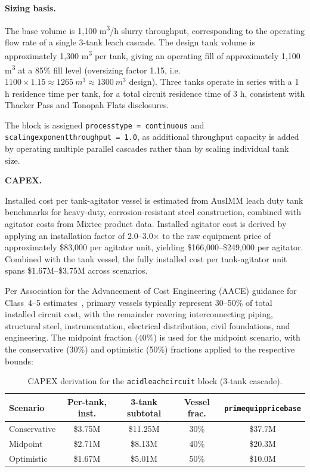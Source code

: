 \documentclass{article}
\renewcommand\_{\textunderscore\allowbreak}
\begin{document}
\medskip
\noindent\textbf{Sizing basis.}\quad

The base volume is 1,100 \si{m^3/h} slurry throughput, corresponding to the operating flow rate of a single 3-tank leach cascade. The design tank volume is approximately 1,300 \si{m^3} per tank, giving an operating fill of approximately 1,100 \si{m^3} at a 85\% fill level (oversizing factor 1.15, i.e.\ $1100 \times 1.15 \approx 1265~ \si{m^3} \approx 1300~\si{m^3}$ design). Three tanks operate in series with a 1 h residence time per tank, for a total circuit residence time of 3 h, consistent with Thacker Pass and Tonopah Flats disclosures.

The block is assigned \texttt{process\_type = continuous} and \texttt{scaling\_exponent\_throughput = 1.0}, as additional throughput capacity is added by operating multiple parallel cascades rather than by scaling individual tank size.

\medskip
\noindent\textbf{CAPEX.}\quad

Installed cost per tank-agitator vessel is estimated from AusIMM leach duty tank benchmarks for heavy-duty, corrosion-resistant steel construction, combined with agitator costs from Mixtec product data. Installed agitator cost is derived by applying an installation factor of 2.0--3.0$\times$ to the raw equipment price of approximately \$83,000 per agitator unit, yielding \$166,000--\$249,000 per agitator. Combined with the tank vessel, the fully installed cost per tank-agitator unit spans \$1.67M--\$3.75M across scenarios.

Per Association for the Advancement of Cost Engineering (AACE) guidance for Class~4--5 estimates~\cite{bredehoeft47R11CostEstimate2020}, primary vessels typically represent 30--50\% of total installed circuit cost, with the remainder covering interconnecting piping, structural steel, instrumentation, electrical distribution, civil foundations, and engineering. The midpoint fraction (40\%) is used for the midpoint scenario, with the conservative (30\%) and optimistic (50\%) fractions applied to the respective bounds:

\begin{table}[h!]
\caption{CAPEX derivation for the \texttt{acid\_leach\_circuit} block (3-tank cascade).}
\centering
\begin{tabular}{lcccc}
\toprule
\textbf{Scenario} & \textbf{Per-tank, inst.} & \textbf{3-tank subtotal} & \textbf{Vessel frac.} & \texttt{prim\_equip\_price\_base} \\
\midrule
Conservative & \$3.75M & \$11.25M & 30\% & \$37.7M \\
Midpoint     & \$2.71M & \$8.13M  & 40\% & \$20.3M \\
Optimistic   & \$1.67M & \$5.01M  & 50\% & \$10.0M \\
\bottomrule
\end{tabular}
\end{table}
\end{document}
